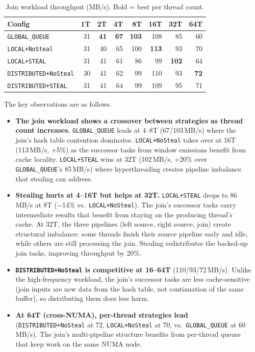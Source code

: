 \begin{table}[h]
\centering
\caption{Join workload throughput (MB/s). Bold = best per thread count.}
\label{tab:ds-join}
\begin{tabular}{l|rrrrrrr}
\hline
\textbf{Config} & \textbf{1T} & \textbf{2T} & \textbf{4T} & \textbf{8T} & \textbf{16T} & \textbf{32T} & \textbf{64T} \\
\hline
\texttt{GLOBAL\_QUEUE}       & 31 & \textbf{41} & \textbf{67} & \textbf{103} & 108 & 85 & 60 \\
\texttt{LOCAL+NoSteal}       & 31 & 40 & 65 & 100 & \textbf{113} & 93 & 70 \\
\texttt{LOCAL+STEAL}         & 31 & 41 & 61 & 86 & 99 & \textbf{102} & 64 \\
\texttt{DISTRIBUTED+NoSteal} & 30 & 41 & 62 & 99 & 110 & 93 & \textbf{72} \\
\texttt{DISTRIBUTED+STEAL}   & 31 & 41 & 64 & 99 & 109 & 95 & 71 \\
\hline
\end{tabular}
\end{table}

The key observations are as follows.
%
\begin{itemize}
    \item \textbf{The join workload shows a crossover between strategies as thread count increases.}
    \texttt{GLOBAL\_QUEUE} leads at 4--8T (67/103\,MB/s) where the join's hash table contention dominates.
    \texttt{LOCAL+NoSteal} takes over at 16T (113\,MB/s, +5\%) as the successor tasks from window emissions benefit from cache locality.
    \texttt{LOCAL+STEAL} wins at 32T (102\,MB/s, +20\% over \texttt{GLOBAL\_QUEUE}'s 85\,MB/s) where hyperthreading creates pipeline imbalance that stealing can address.

    \item \textbf{Stealing hurts at 4--16T but helps at 32T.}
    \texttt{LOCAL+STEAL} drops to 86\,MB/s at 8T ($-$14\% vs.\ \texttt{LOCAL+NoSteal}).
    The join's successor tasks carry intermediate results that benefit from staying on the producing thread's cache.
    At 32T, the three pipelines (left source, right source, join) create structural imbalance: some threads finish their source pipeline early and idle, while others are still processing the join.
    Stealing redistributes the backed-up join tasks, improving throughput by 20\%.

    \item \textbf{\texttt{DISTRIBUTED+NoSteal} is competitive at 16--64T} (110/93/72\,MB/s).
    Unlike the high-frequency workload, the join's successor tasks are less cache-sensitive (join inputs are new data from the hash table, not continuation of the same buffer), so distributing them does less harm.

    \item \textbf{At 64T (cross-NUMA), per-thread strategies lead} (\texttt{DISTRIBUTED+NoSteal} at 72, \texttt{LOCAL+NoSteal} at 70, vs.\ \texttt{GLOBAL\_QUEUE} at 60\,MB/s).
    The join's multi-pipeline structure benefits from per-thread queues that keep work on the same NUMA node.
\end{itemize}

